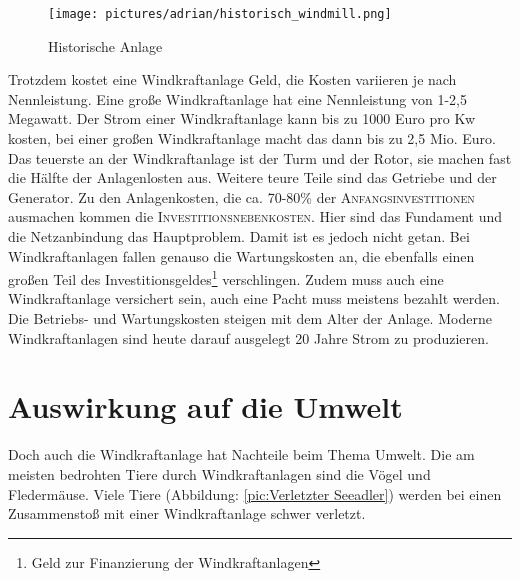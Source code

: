 \documentclass[12pt]{scrbook}
\begin{document}
 \begin{wrapfigure}[28]{r}{0.56\textwidth}
 	\vspace{-10pt}
	\centering
    \texttt{[image: pictures/adrian/historisch\_windmill.png]}
  	\caption{Historische Anlage}
  	\label{pic:Historische Anlage}
\end{wrapfigure}
Trotzdem kostet eine Windkraftanlage Geld, die Kosten variieren je
nach Nennleistung. Eine große Windkraftanlage  hat eine Nennleistung von 1-2,5
Megawatt. Der Strom einer Windkraftanlage kann bis zu 1000 Euro pro Kw kosten,
bei einer großen Windkraftanlage macht das dann bis zu 2,5 Mio. Euro. Das
teuerste an der Windkraftanlage ist der Turm und der Rotor, sie machen fast
die Hälfte der Anlagenlosten aus. Weitere teure Teile sind das Getriebe und
der Generator. Zu den Anlagenkosten, die ca. 70-80\% der \textsc{Anfangsinvestitionen}
ausmachen kommen die \textsc{Investitionsnebenkosten}. Hier sind das Fundament und die
Netzanbindung das Hauptproblem. Damit ist es jedoch nicht getan. Bei
Windkraftanlagen fallen genauso die Wartungskosten an, die ebenfalls einen
großen Teil des Investitionsgeldes\footnote{Geld zur Finanzierung der Windkraftanlagen} verschlingen. Zudem muss auch eine
Windkraftanlage versichert sein, auch eine Pacht muss meistens bezahlt werden.
Die Betriebs- und Wartungskosten steigen mit dem Alter der Anlage. Moderne
Windkraftanlagen sind heute darauf ausgelegt 20 Jahre Strom zu produzieren.

\newpage


\section{Auswirkung auf die Umwelt}

Doch auch die Windkraftanlage hat Nachteile beim Thema Umwelt. Die am meisten
bedrohten Tiere durch Windkraftanlagen sind die Vögel und Fledermäuse. Viele Tiere (Abbildung: \ref{pic:Verletzter Seeadler})
werden bei einen Zusammenstoß mit einer Windkraftanlage schwer verletzt. 
\end{document}
